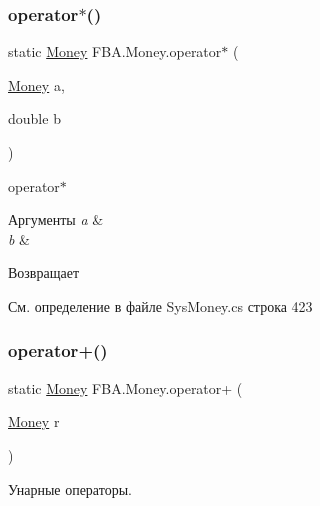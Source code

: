 \subsubsection{\texorpdfstring{operator$\ast$()}{operator*()}\hspace{0.1cm}{\footnotesize\ttfamily [2/2]}}
{\footnotesize\ttfamily static \mbox{\hyperlink{struct_f_b_a_1_1_money}{Money}} F\+B\+A.\+Money.\+operator$\ast$ (\begin{DoxyParamCaption}\item[{\mbox{\hyperlink{struct_f_b_a_1_1_money}{Money}}}]{a,  }\item[{double}]{b }\end{DoxyParamCaption})\hspace{0.3cm}{\ttfamily [static]}}



operator$\ast$ 


\begin{DoxyParams}{Аргументы}
{\em a} & \\
\hline
{\em b} & \\
\hline
\end{DoxyParams}
\begin{DoxyReturn}{Возвращает}

\end{DoxyReturn}


См. определение в файле Sys\+Money.\+cs строка 423

\mbox{\label{struct_f_b_a_1_1_money_aac56eddcf65384f01269e929db661c39}} 
\subsubsection{\texorpdfstring{operator+()}{operator+()}\hspace{0.1cm}{\footnotesize\ttfamily [1/2]}}
{\footnotesize\ttfamily static \mbox{\hyperlink{struct_f_b_a_1_1_money}{Money}} F\+B\+A.\+Money.\+operator+ (\begin{DoxyParamCaption}\item[{\mbox{\hyperlink{struct_f_b_a_1_1_money}{Money}}}]{r }\end{DoxyParamCaption})\hspace{0.3cm}{\ttfamily [static]}}



Унарные операторы. 


